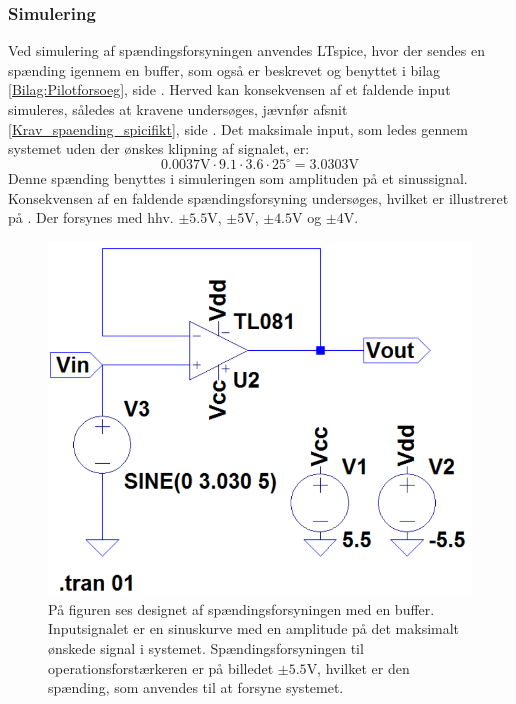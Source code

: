 \subsubsection{Simulering}
Ved simulering af spændingsforsyningen anvendes LTspice, hvor der sendes en spænding igennem en buffer, som også er beskrevet og benyttet i bilag \ref{Bilag:Pilotforsoeg}, side \pageref{Bilag:Pilotforsoeg}. Herved kan konsekvensen af et faldende input simuleres, således at kravene undersøges, jævnfør afsnit \ref{Krav_spaending_spicifikt}, side \pageref{Krav_spaending_spicifikt}. Det maksimale input, som ledes gennem systemet uden der ønskes klipning af signalet, er:
\begin{equation}
0.0037\text{V} \cdot 9.1 \cdot 3.6 \cdot 25^{\circ} = 3.0303\text{V}
\end{equation}
\noindent Denne spænding benyttes i simuleringen som amplituden på et sinussignal. Konsekvensen af en faldende spændingsforsyning undersøges, hvilket er illustreret på . Der forsynes med hhv. $\pm5.5$V, $\pm5$V, $\pm4.5$V og $\pm4$V.
\begin{figure}[H]
	\centering
	\includegraphics[scale=0.4]{figures/cProblemloesning/Spaendingsforsyning_LTspice2.PNG}
	\caption{På figuren ses designet af spændingsforsyningen med en buffer. Inputsignalet er en sinuskurve med en amplitude på det maksimalt ønskede signal i systemet. Spændingsforsyningen til operationsforstærkeren er på billedet $\pm5.5$V, hvilket er den spænding, som anvendes til at forsyne systemet.}
	\label{fig:spaendingsforsyning}
\end{figure}

